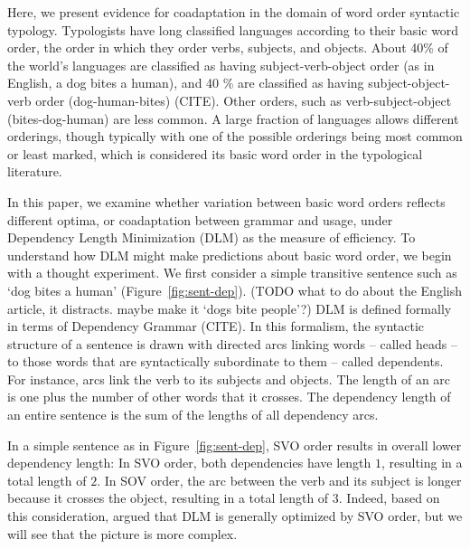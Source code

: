 \documentclass[11pt,a4paper]{article}
\newcommand\mhahn[1]{{\color{red}(#1)}}
\begin{document}
Here, we present evidence for coadaptation in the domain of word order syntactic typology.
Typologists have long classified languages according to their basic word order, the order in which they order verbs, subjects, and objects.
About 40\% of the world's languages are classified as having subject-verb-object order (as in English, a dog bites a human), and 40 \% are classified as having subject-object-verb order (dog-human-bites) (CITE).
Other orders, such as verb-subject-object (bites-dog-human) are less common.
A large fraction of languages allows different orderings, though typically with one of the possible orderings being most common or least marked, which is considered its basic word order in the typological literature.

In this paper, we examine whether variation between basic word orders reflects different optima, or coadaptation between grammar and usage, under Dependency Length Minimization (DLM) as the measure of efficiency.
To understand how DLM might make predictions about basic word order, we begin with a thought experiment.
We first consider a simple transitive sentence such as `dog bites a human' (Figure~\ref{fig:sent-dep}). \mhahn{TODO what to do about the English article, it distracts. maybe make it `dogs bite people'?}
DLM is defined formally in terms of Dependency Grammar (CITE).
In this formalism, the syntactic structure of a sentence is drawn with directed arcs linking words -- called heads -- to those words that are syntactically subordinate to them -- called dependents.
For instance, arcs link the verb to its subjects and objects.
The length of an arc is one plus the number of other words that it crosses.
The dependency length of an entire sentence is the sum of the lengths of all dependency arcs.

In a simple sentence as in Figure~\ref{fig:sent-dep}, SVO order results in overall lower dependency length:
In SVO order, both dependencies have length $1$, resulting in a total length of $2$.
In SOV order, the arc between the verb and its subject is longer because it crosses the object, resulting in a total length of $3$.
Indeed, based on this consideration, \cite{ferrer-i-cancho-placement-2017} argued that DLM is generally optimized by SVO order, but we will see that the picture is more complex.
\end{document}
